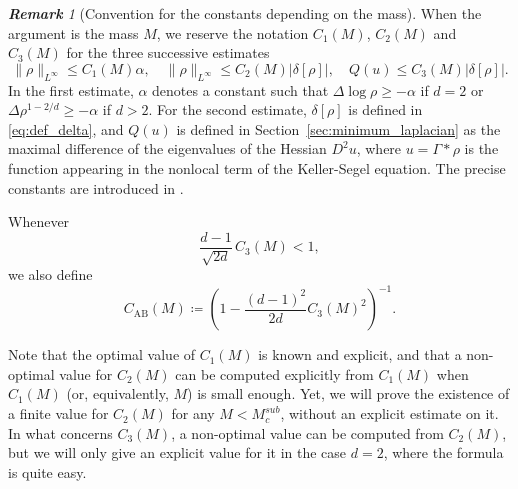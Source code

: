 \documentclass[11pt,a4paper]{article}
\numberwithin{equation}{section}
\theoremstyle{plain}
\theoremstyle{remark}
\newtheorem{remark}[theorem]{\bf Remark}
\begin{document}
\begin{remark}[Convention for the constants depending on the mass]
\label{rem:mass_constants}
When the argument is the mass $M$, we reserve the notation
$C_1(M)$, $C_2(M)$ and $C_3(M)$ for the three successive estimates
$$
\|\rho\|_{L^\infty} \le C_1(M)\alpha, \quad
\|\rho\|_{L^\infty} \le C_2(M)|\delta[\rho]|, \quad
Q(u)  \le C_3(M)|\delta[\rho]|.
$$
In the first estimate, $\alpha$ denotes a constant such that $\Delta\log\rho\ge-\alpha$ if $d=2$ or
$\Delta\rho^{1-2/d}\ge-\alpha$ if $d>2$. For the second estimate,
$\delta[\rho]$ is defined in \eqref{eq:def_delta}, and $Q(u)$ is
defined in Section~\ref{sec:minimum_laplacian} as the maximal difference of the eigenvalues of the Hessian $D^2u$, where $u=\Gamma*\rho$ is the function appearing in the nonlocal term of the Keller-Segel equation. The precise constants
are introduced in
.

Whenever
$$
\frac{d-1}{\sqrt{2d}}\,C_3(M)<1,
$$
we also define
\begin{equation}\label{eq:def_CAB}
C_{\mathrm{AB}}(M) \coloneqq \left( 1-\frac{(d-1)^2}{2d}C_3(M)^2 \right)^{-1}.
\end{equation}

Note that the optimal value of $C_1(M)$ is known and explicit, and that a non-optimal value for $C_2(M)$ can be computed explicitly from $C_1(M)$ when $C_1(M)$ (or, equivalently, $M$) is small enough. Yet, we will prove the existence of a finite value for $C_2(M)$ for any $M<M^{sub}_c$, without an explicit estimate on it. In what concerns $C_3(M)$, a non-optimal value can be computed from $C_2(M)$, but we will only give an explicit value for it in the case $d=2$, where the formula is quite easy.
\end{remark}
\end{document}
